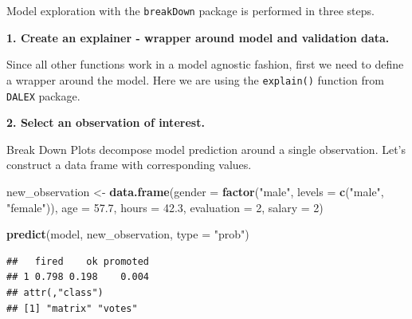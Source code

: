 \documentclass[]{book}
\newenvironment{Shaded}{\begin{snugshade}}{\end{snugshade}}
\newcommand{\ControlFlowTok}[1]{\textcolor[rgb]{0.13,0.29,0.53}{\textbf{#1}}}
\newcommand{\DataTypeTok}[1]{\textcolor[rgb]{0.13,0.29,0.53}{#1}}
\newcommand{\DecValTok}[1]{\textcolor[rgb]{0.00,0.00,0.81}{#1}}
\newcommand{\FloatTok}[1]{\textcolor[rgb]{0.00,0.00,0.81}{#1}}
\newcommand{\KeywordTok}[1]{\textcolor[rgb]{0.13,0.29,0.53}{\textbf{#1}}}
\newcommand{\NormalTok}[1]{#1}
\newcommand{\OperatorTok}[1]{\textcolor[rgb]{0.81,0.36,0.00}{\textbf{#1}}}
\newcommand{\StringTok}[1]{\textcolor[rgb]{0.31,0.60,0.02}{#1}}
\theoremstyle{definition}
\theoremstyle{definition}
\theoremstyle{definition}
\theoremstyle{remark}
\begin{document}
Model exploration with the \texttt{breakDown} package is performed in
three steps.

\textbf{1. Create an explainer - wrapper around model and validation
data.}

Since all other functions work in a model agnostic fashion, first we
need to define a wrapper around the model. Here we are using the
\texttt{explain()} function from \texttt{DALEX} package.

\begin{Shaded}
\end{Shaded}

\textbf{2. Select an observation of interest.}

Break Down Plots decompose model prediction around a single observation.
Let's construct a data frame with corresponding values.

\begin{Shaded}
\begin{Highlighting}[]
\NormalTok{new_observation <-}\StringTok{ }\KeywordTok{data.frame}\NormalTok{(}\DataTypeTok{gender =} \KeywordTok{factor}\NormalTok{(}\StringTok{"male"}\NormalTok{, }\DataTypeTok{levels =} \KeywordTok{c}\NormalTok{(}\StringTok{"male"}\NormalTok{, }\StringTok{"female"}\NormalTok{)),}
                      \DataTypeTok{age =} \FloatTok{57.7}\NormalTok{,}
                      \DataTypeTok{hours =} \FloatTok{42.3}\NormalTok{,}
                      \DataTypeTok{evaluation =} \DecValTok{2}\NormalTok{,}
                      \DataTypeTok{salary =} \DecValTok{2}\NormalTok{)}

\KeywordTok{predict}\NormalTok{(model, new_observation, }\DataTypeTok{type =} \StringTok{"prob"}\NormalTok{)}
\end{Highlighting}
\end{Shaded}

\begin{verbatim}
##   fired    ok promoted
## 1 0.798 0.198    0.004
## attr(,"class")
## [1] "matrix" "votes"
\end{verbatim}
\end{document}
